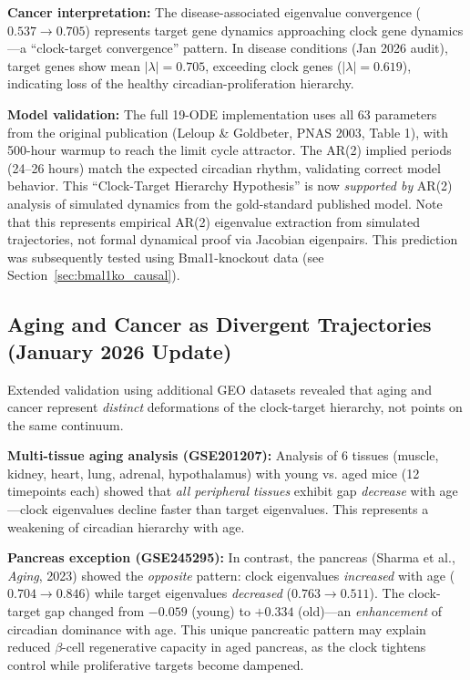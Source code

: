 \documentclass[11pt,a4paper]{article}
\begin{document}
\textbf{Cancer interpretation:} The disease-associated eigenvalue convergence ($0.537 \to 0.705$) represents target gene dynamics approaching clock gene dynamics---a ``clock-target convergence'' pattern. In disease conditions (Jan 2026 audit), target genes show mean $|\lambda| = 0.705$, exceeding clock genes ($|\lambda| = 0.619$), indicating loss of the healthy circadian-proliferation hierarchy.

\textbf{Model validation:} The full 19-ODE implementation uses all 63 parameters from the original publication (Leloup \& Goldbeter, PNAS 2003, Table 1), with 500-hour warmup to reach the limit cycle attractor. The AR(2) implied periods (24--26 hours) match the expected circadian rhythm, validating correct model behavior. This ``Clock-Target Hierarchy Hypothesis'' is now \textit{supported by} AR(2) analysis of simulated dynamics from the gold-standard published model. Note that this represents empirical AR(2) eigenvalue extraction from simulated trajectories, not formal dynamical proof via Jacobian eigenpairs. This prediction was subsequently tested using Bmal1-knockout data (see Section~\ref{sec:bmal1ko_causal}).

\subsection{Aging and Cancer as Divergent Trajectories (January 2026 Update)}

Extended validation using additional GEO datasets revealed that aging and cancer represent \textit{distinct} deformations of the clock-target hierarchy, not points on the same continuum.

\textbf{Multi-tissue aging analysis (GSE201207):} Analysis of 6 tissues (muscle, kidney, heart, lung, adrenal, hypothalamus) with young vs. aged mice (12 timepoints each) showed that \textit{all peripheral tissues} exhibit gap \textit{decrease} with age---clock eigenvalues decline faster than target eigenvalues. This represents a weakening of circadian hierarchy with age.

\textbf{Pancreas exception (GSE245295):} In contrast, the pancreas (Sharma et al., \textit{Aging}, 2023) showed the \textit{opposite} pattern: clock eigenvalues \textit{increased} with age ($0.704 \to 0.846$) while target eigenvalues \textit{decreased} ($0.763 \to 0.511$). The clock-target gap changed from $-0.059$ (young) to $+0.334$ (old)---an \textit{enhancement} of circadian dominance with age. This unique pancreatic pattern may explain reduced $\beta$-cell regenerative capacity in aged pancreas, as the clock tightens control while proliferative targets become dampened.
\end{document}
